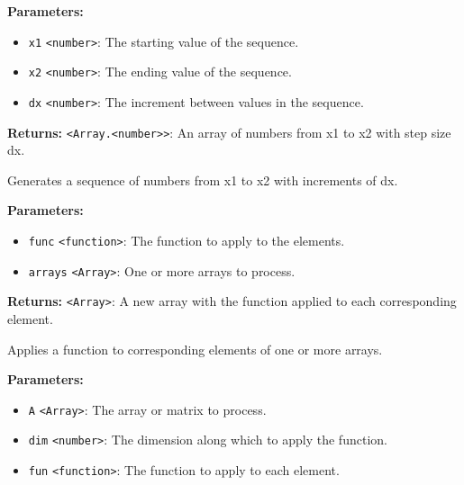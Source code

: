 \documentclass[12pt,a4paper]{article}
\begin{document}
\noindent \textbf{Parameters:}
\begin{itemize}
  \item \texttt{x1} \texttt{<number>}: The starting value of the sequence.
  \item \texttt{x2} \texttt{<number>}: The ending value of the sequence.
  \item \texttt{dx} \texttt{<number>}: The increment between values in the sequence.
\end{itemize}

\noindent \textbf{Returns:} \texttt{<Array.<number>>}: An array of numbers from \textasciigrave{}x1\textasciigrave{} to \textasciigrave{}x2\textasciigrave{} with step size \textasciigrave{}dx\textasciigrave{}.

\noindent Generates a sequence of numbers from \textasciigrave{}x1\textasciigrave{} to \textasciigrave{}x2\textasciigrave{} with increments of \textasciigrave{}dx\textasciigrave{}.

\vspace{5mm}
\noindent {}


\noindent \textbf{Parameters:}
\begin{itemize}
  \item \texttt{func} \texttt{<function>}: The function to apply to the elements.
  \item \texttt{arrays} \texttt{<Array>}: One or more arrays to process.
\end{itemize}

\noindent \textbf{Returns:} \texttt{<Array>}: A new array with the function applied to each corresponding element.

\noindent Applies a function to corresponding elements of one or more arrays.

\vspace{5mm}
\noindent {}


\noindent \textbf{Parameters:}
\begin{itemize}
  \item \texttt{A} \texttt{<Array>}: The array or matrix to process.
  \item \texttt{dim} \texttt{<number>}: The dimension along which to apply the function.
  \item \texttt{fun} \texttt{<function>}: The function to apply to each element.
\end{itemize}
\end{document}
